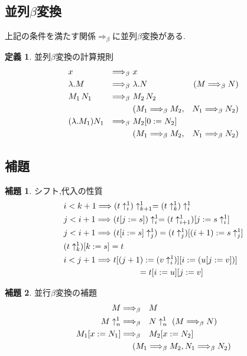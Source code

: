 \documentclass[a4j,10pt]{jsarticle}
\theoremstyle{definition}
\newtheorem*{definition*}{定義}
\newtheorem{lemma}{補題}
\newcommand{\pbetah}{\Longrightarrow_\beta }
\begin{document}
\subsection*{並列\(\beta\)変換}
上記の条件を満たす関係\(\pbetah\)に並列\(\beta\)変換がある.
\begin{definition*}
並列\(\beta\)変換の計算規則
\begin{alignat}{3}
& x &\pbetah\ & x\\
& \lambda . M &\pbetah\ &\lambda. N &(M \pbetah N)\\
& M_1\, N_1 &\pbetah\ & M_2\, N_2 \notag \\
    &&&(M_1 \pbetah M_2,& N_1 \pbetah N_2)\\
& (\lambda. M_1) N_1 &\pbetah\ & M_2[0:= N_2]& \notag\\
    & & &(M_1 \pbetah M_2,& N_1 \pbetah N_2)
\end{alignat}
\end{definition*}

\subsection*{補題}
\begin{lemma}
シフト,代入の性質
\begin{alignat}{3}
    & i < k + 1 \Longrightarrow (t\uparrow_i^1)\uparrow_{k + 1}^1= (t \uparrow_k^1)\uparrow_i^1\label{eq:shift-shift} \\
    & j < i + 1 \Longrightarrow (t[j:= s])\uparrow_i^1 = (t\uparrow_{i+1}^1)[j := s\uparrow_i^1]\label{eq:sub-shift} \\
    & j < i + 1 \Longrightarrow  (t[i := s]\uparrow_j^1)= (t \uparrow_j^1)[(i+1) := s\uparrow_j^1] \label{eq:sub-shift-lt}\\
    & (t\uparrow_k^1)[k := s] = t\label{shift-sub} \\
    & i < j + 1 \Longrightarrow t[(j + 1) := (v \uparrow_i^1)][i := (u [j := v])] \notag \\
    & \hspace{90pt} = t[i := u][j := v]\label{eq:subsub}
\end{alignat}
\end{lemma}

\begin{lemma}
並行\(\beta\)変換の補題
\begin{alignat}{3}
M &\pbetah & &M \label{eq:refl} \\
M \uparrow_n^1 &\pbetah & &N\uparrow_n^1 \hspace{3pt}(M \pbetah N) \label{eq:shif-pre} \\
M_1[x:= N_1] &\pbetah & &M_2 [x:= N_2]\\
&&& \hspace{-20pt}(M_1 \pbetah M_2, N_1 \pbetah N_2) \label{eq:sub-pre}
\end{alignat}
\end{lemma}
\end{document}
